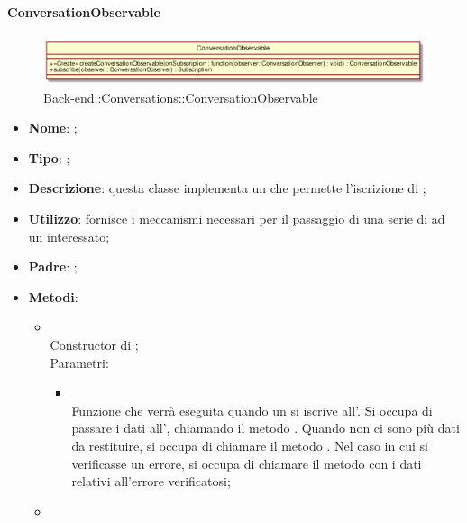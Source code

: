 \hypertarget{ConversationObservable_label}{\paragraph{ConversationObservable}}
\begin{figure}[h]
	\centering
	\includegraphics[width=\textwidth,height=\textheight,keepaspectratio]{images/ClassConversationObservable.png}
	\caption{Back-end::Conversations::ConversationObservable}
\end{figure}
\begin{itemize}
	\item \textbf{Nome}: ;
	\item \textbf{Tipo}: ;
	\item \textbf{Descrizione}: questa classe implementa un  che permette l'iscrizione di ;
	\item \textbf{Utilizzo}: fornisce i meccanismi necessari per il passaggio di una serie di  ad un  interessato;
	\item \textbf{Padre}: ;
	\item \textbf{Metodi}:
	\begin{itemize}
		\item[]  \\
		Constructor di ;\\
		Parametri:
		\begin{itemize}
			\item {} \\
			Funzione che verrà eseguita quando un  si iscrive all'. Si occupa di passare i dati all', chiamando il metodo . Quando non ci sono più dati da restituire, si occupa di chiamare il metodo . Nel caso in cui si verificasse un errore, si occupa di chiamare il metodo  con i dati relativi all'errore verificatosi;
		\end{itemize}
		\item[]  \\

\end{itemize}
\end{itemize}
